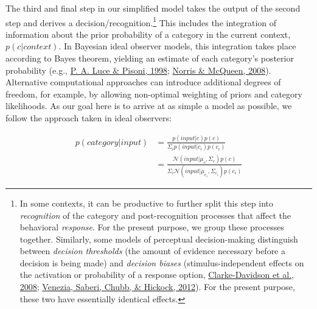\documentclass[
  11pt,
  english,
  man,floatsintext]{apa6}
\begin{document}
The third and final step in our simplified model takes the output of the second step and derives a decision/recognition.\footnote{In some contexts, it can be productive to further split this step into \emph{recognition} of the category and post-recognition processes that affect the behavioral \emph{response}. For the present purpose, we group these processes together. Similarly, some models of perceptual decision-making distinguish between \emph{decision thresholds} (the amount of evidence necessary before a decision is being made) and \emph{decision biases} (stimulus-independent effects on the activation or probability of a response option, \protect\hyperlink{ref-clarkedavidson2008}{Clarke-Davidson et al., 2008}; \protect\hyperlink{ref-venezia2012}{Venezia, Saberi, Chubb, \& Hickock, 2012}). For the present purpose, these two have essentially identical effects.} This includes the integration of information about the prior probability of a category in the current context, \(p(c | context)\). In Bayesian ideal observer models, this integration takes place according to Bayes theorem, yielding an estimate of each category's posterior probability (e.g., \protect\hyperlink{ref-luce-pisoni1998}{P. A. Luce \& Pisoni, 1998}; \protect\hyperlink{ref-norris-mcqueen2008}{Norris \& McQueen, 2008}). Alternative computational approaches can introduce additional degrees of freedom, for example, by allowing non-optimal weighting of priors and category likelihoods. As our goal here is to arrive at as simple a model as possible, we follow the approach taken in ideal observers:

\begin{equation}\label{eq:posterior-probability}
\begin{split}
p(category | input) & = \frac{p(input | c) p(c)}{\Sigma_i p(input | c_i) p(c_i)} \\
                    & = \frac{\mathcal{N}\!(input | \mu_c, \Sigma_c) p(c)}{\Sigma_i \mathcal{N}\!(input | \mu_{c_i}, \Sigma_{c_i}) p(c_i)}
\end{split}
\end{equation}
\end{document}
